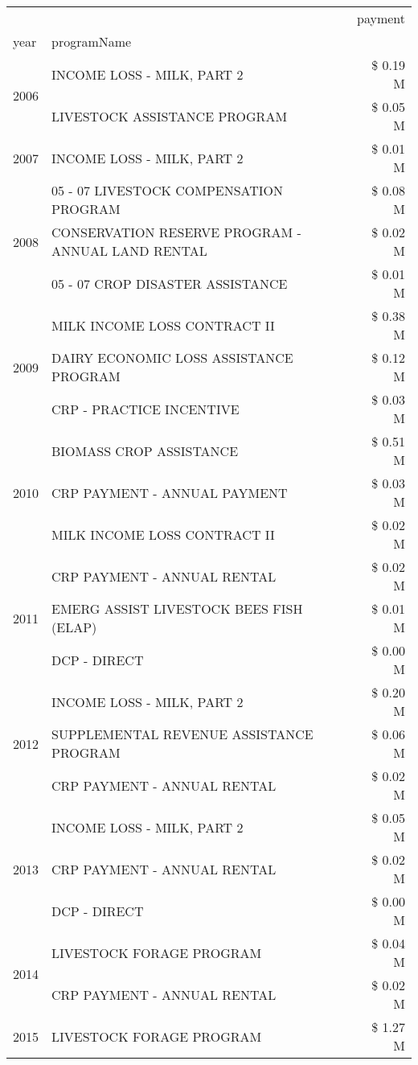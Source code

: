 \begin{tabular}{llr}
\toprule
 &  & payment \\
year & programName &  \\
\midrule
\multirow[t]{2}{*}{2006} & INCOME LOSS - MILK, PART 2 & \$ 0.19 M \\
 & LIVESTOCK ASSISTANCE PROGRAM & \$ 0.05 M \\
\cline{1-3}
2007 & INCOME LOSS - MILK, PART 2 & \$ 0.01 M \\
\cline{1-3}
\multirow[t]{3}{*}{2008} & 05 - 07 LIVESTOCK COMPENSATION PROGRAM & \$ 0.08 M \\
 & CONSERVATION RESERVE PROGRAM - ANNUAL LAND RENTAL & \$ 0.02 M \\
 & 05 - 07 CROP DISASTER ASSISTANCE & \$ 0.01 M \\
\cline{1-3}
\multirow[t]{3}{*}{2009} & MILK INCOME LOSS CONTRACT II & \$ 0.38 M \\
 & DAIRY ECONOMIC LOSS ASSISTANCE PROGRAM & \$ 0.12 M \\
 & CRP - PRACTICE INCENTIVE & \$ 0.03 M \\
\cline{1-3}
\multirow[t]{3}{*}{2010} & BIOMASS CROP ASSISTANCE & \$ 0.51 M \\
 & CRP PAYMENT - ANNUAL PAYMENT & \$ 0.03 M \\
 & MILK INCOME LOSS CONTRACT II & \$ 0.02 M \\
\cline{1-3}
\multirow[t]{3}{*}{2011} & CRP PAYMENT - ANNUAL RENTAL & \$ 0.02 M \\
 & EMERG ASSIST LIVESTOCK BEES FISH (ELAP) & \$ 0.01 M \\
 & DCP - DIRECT & \$ 0.00 M \\
\cline{1-3}
\multirow[t]{3}{*}{2012} & INCOME LOSS - MILK, PART 2 & \$ 0.20 M \\
 & SUPPLEMENTAL REVENUE ASSISTANCE PROGRAM & \$ 0.06 M \\
 & CRP PAYMENT - ANNUAL RENTAL & \$ 0.02 M \\
\cline{1-3}
\multirow[t]{3}{*}{2013} & INCOME LOSS - MILK, PART 2 & \$ 0.05 M \\
 & CRP PAYMENT - ANNUAL RENTAL & \$ 0.02 M \\
 & DCP - DIRECT & \$ 0.00 M \\
\cline{1-3}
\multirow[t]{2}{*}{2014} & LIVESTOCK FORAGE PROGRAM & \$ 0.04 M \\
 & CRP PAYMENT - ANNUAL RENTAL & \$ 0.02 M \\
\cline{1-3}
\multirow[t]{2}{*}{2015} & LIVESTOCK FORAGE PROGRAM & \$ 1.27 M \\

\end{tabular}
